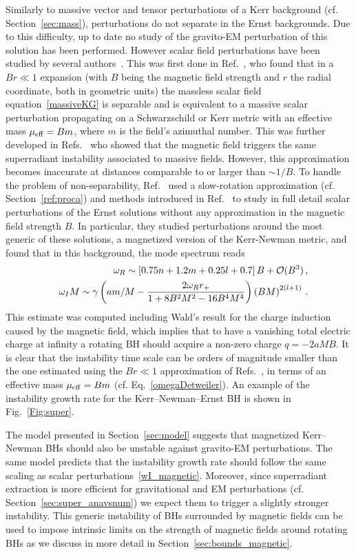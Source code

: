 \documentclass[11pt]{article}
\def\beq{\begin{eqnarray}}
\def\eeq{\end{eqnarray}}
\numberwithin{equation}{section} %
\begin{document}
Similarly to massive vector and tensor perturbations of a Kerr background (cf. Section~\ref{sec:mass}), perturbations do 
not separate in the Ernst backgrounds. Due to this difficulty, up to date no study of the gravito-EM perturbation of 
this solution has been performed. However scalar field perturbations have been studied by several 
authors~\cite{Galtsov:1978ag,Konoplya:2007yy,Konoplya:2008hj,Brito:2014nja}. This was first done in 
Ref.~\cite{Galtsov:1978ag}, who found that in a $Br\ll 1$ expansion (with $B$ being the magnetic field strength and $r$ 
the radial coordinate, both in geometric units) the massless scalar field equation~\eqref{massiveKG} is separable and is 
equivalent to a massive scalar perturbation propagating on a Schwarzschild or Kerr metric with an effective mass 
$\mu_{\rm eff}=Bm$, where $m$ is the field's azimuthal number. This was further developed in 
Refs.~\cite{Konoplya:2007yy,Konoplya:2008hj} who showed that the magnetic field triggers the same superradiant 
instability associated to massive fields. However, this approximation becomes inaccurate at distances comparable to or 
larger than $\sim 1/B$.
To handle the problem of non-separability, Ref.~\cite{Brito:2014nja} used a slow-rotation approximation (cf. Section~\ref{ref:proca}) and methods introduced in Ref.~\cite{Dolan:2012yt} to study in full detail scalar perturbations of the Ernst solutions without any approximation in the magnetic field strength $B$. In particular, they studied perturbations around the most generic of these solutions, a magnetized version of the Kerr-Newman metric, and found that in this background, the mode spectrum reads
%
\beq
&&\omega_R\sim \left[0.75n+1.2m+0.25l+0.7\right]B+{\cal O}(B^3)\,,\\
&&\omega_I M\sim \gamma\left(a m/M-\frac{2\omega_R r_+}{1+8B^2M^2-16B^4M^4}\right)\left(BM\right)^{2(l+1)}\label{wI_magnetic}\,.
\eeq
%
This estimate was computed including Wald's result for the charge induction~\cite{Wald:1974np} caused by the  magnetic field, which implies that to have a vanishing total electric charge at infinity a rotating BH should acquire a non-zero charge $q=-2a M B$. It is clear that the instability time scale can be orders of magnitude smaller than the one estimated using the $Br\ll 1$ approximation of Refs.~\cite{Galtsov:1978ag,Konoplya:2007yy,Konoplya:2008hj}, in terms of an effective mass $\mu_{\rm eff}=Bm$ (cf. Eq.~\eqref{omegaDetweiler}). An example of the instability growth rate for the Kerr--Newman--Ernst BH is shown in Fig.~\ref{Fig:super}. 

The model presented in Section~\ref{sec:model} suggests that magnetized Kerr--Newman BHs should also be unstable against 
gravito-EM perturbations. The same model predicts that the instability growth rate should follow the same scaling as 
scalar perturbations~\eqref{wI_magnetic}. Moreover, since superradiant extraction is more efficient for gravitational 
and EM perturbations (cf. Section~\ref{sec:super_anavsnum}) we expect them to trigger a slightly stronger 
instability. This generic instability of BHs surrounded by magnetic fields can be used to impose intrinsic limits on the 
strength of magnetic fields around rotating BHs as we discuss in more detail in Section~\ref{sec:bounds_magnetic}.   
\end{document}
